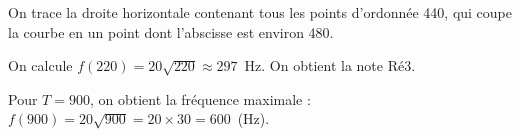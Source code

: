 
\medskip

%  
%
%
% 
%
%
%
%
 

On trace la droite horizontale contenant tous les points d’ordonnée 440, qui coupe la courbe en un point dont l’abscisse est environ 480.

On calcule $f(220) = 20 \sqrt{220} \approx 297$~Hz. On obtient la note Ré3.
 
 
Pour $T = 900$, on obtient la fréquence maximale : $f(900) = 20 \sqrt{900} = 20 \times 30 = 600$~(Hz).

\bigskip

